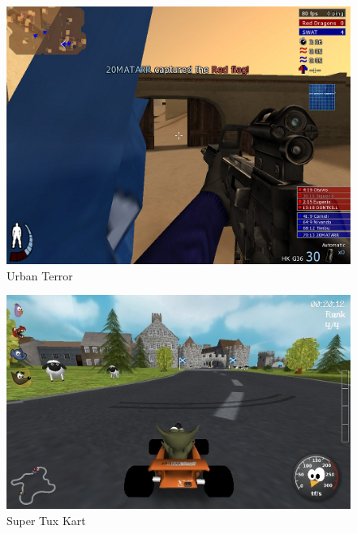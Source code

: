 \begin{frame}
\begin{columns}
	\begin{column}{4cm}
	\begin{figure}
		\includegraphics[scale=0.18]{img/urbanterror.jpg}
		\caption{Urban Terror}
	\end{figure}
	
	\begin{figure}
		\includegraphics[scale=0.18]{img/stk.jpg}
		\caption{Super Tux Kart}
	\end{figure}
	\end{column}
\end{columns}

\end{frame}

